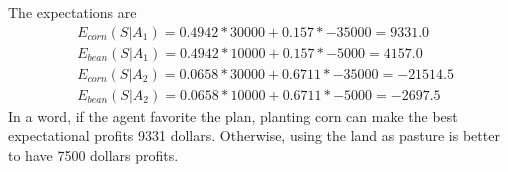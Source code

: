 \documentclass{article}
\begin{document}
The expectations are
\begin{align*}
    &E_{corn}(S|A_1)=0.4942*30000+0.157*-35000=9331.0\\
    &E_{bean}(S|A_1)=0.4942*10000+0.157*-5000=4157.0\\
    &E_{corn}(S|A_2)=0.0658*30000+0.6711*-35000=-21514.5\\
    &E_{bean}(S|A_2)=0.0658*10000+0.6711*-5000=-2697.5
\end{align*}
In a word, if the agent favorite the plan, planting corn can make the best expectational profits 9331 dollars.
Otherwise, using the land as pasture is better to have 7500 dollars profits.
\end{document}
